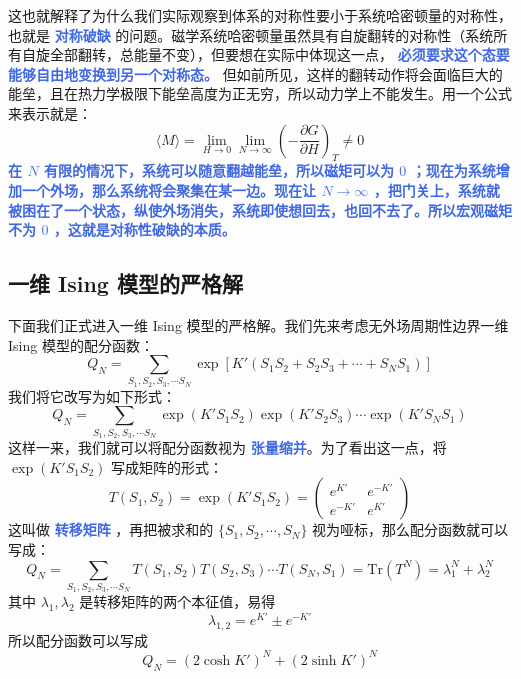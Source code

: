 这也就解释了为什么我们实际观察到体系的对称性要小于系统哈密顿量的对称性，也就是 \textcolor{RoyalBlue}{\textbf{\kaishu 对称破缺}} 的问题。磁学系统哈密顿量虽然具有自旋翻转的对称性（系统所有自旋全部翻转，总能量不变），但要想在实际中体现这一点， \textcolor{RoyalBlue}{\textbf{\kaishu 必须要求这个态要能够自由地变换到另一个对称态。}} 但如前所见，这样的翻转动作将会面临巨大的能垒，且在热力学极限下能垒高度为正无穷，所以动力学上不能发生。用一个公式来表示就是：
\begin{equation}\label{equ:对称性破缺}
    \langle M \rangle  = \lim_{H\rightarrow 0}  \lim_{N\rightarrow \infty} \left(-\frac{\partial G}{\partial H}\right)_T \neq 0  
\end{equation}
\textcolor{RoyalBlue}{\textbf{\kaishu 在 $N$ 有限的情况下，系统可以随意翻越能垒，所以磁矩可以为 $0$ ；现在为系统增加一个外场，那么系统将会聚集在某一边。现在让 $N\rightarrow \infty$ ，把门关上，系统就被困在了一个状态，纵使外场消失，系统即使想回去，也回不去了。所以宏观磁矩不为 $0$ ，这就是对称性破缺的本质。}}

\subsection{一维 Ising 模型的严格解}\label{sub:一维Ising模型的严格解}

下面我们正式进入一维 Ising 模型的严格解。我们先来考虑无外场周期性边界一维 Ising 模型的配分函数：
\begin{equation}\label{equ:一维Ising模型的配分函数}
    Q_N = \sum_{S_1,S_2,S_3,\cdots S_N} \exp\left[K' (S_1 S_{2}+S_2S_3+\cdots+S_NS_1)\right]
\end{equation}
我们将它改写为如下形式：
\begin{equation}
    Q_N = \sum_{S_1,S_2,S_3,\cdots S_N} \exp(K' S_1 S_{2}) \exp(K' S_2 S_{3}) \cdots \exp(K' S_N S_{1})
\end{equation}
这样一来，我们就可以将配分函数视为 \textcolor{RoyalBlue}{\textbf{\kaishu 张量缩并}}。为了看出这一点，将 $\exp(K' S_1 S_2)$ 写成矩阵的形式：
\begin{equation}
    T(S_1,S_2) = \exp(K' S_1 S_{2}) = \begin{pmatrix}
        e^{K'} & e^{-K'} \\
        e^{-K'} & e^{K'}
    \end{pmatrix}
\end{equation}
这叫做 \textcolor{RoyalBlue}{\textbf{\kaishu 转移矩阵}} ，再把被求和的 $\{S_1,S_2,\cdots,S_N\}$ 视为哑标，那么配分函数就可以写成：
\begin{equation}
    Q_N = \sum_{S_1,S_2,S_3,\cdots S_N} T(S_1,S_2) T(S_2,S_3) \cdots T(S_N,S_1) = \text{Tr}(T^N) = \lambda _1^N + \lambda_2^N
\end{equation}
其中 $\lambda_1,\lambda_2$ 是转移矩阵的两个本征值，易得
\begin{equation}
    \lambda_{1,2} = e^{K'} \pm e^{-K'}
\end{equation}
所以配分函数可以写成
\begin{equation}
    Q_N = (2\cosh K')^N + (2\sinh K')^N
\end{equation}

